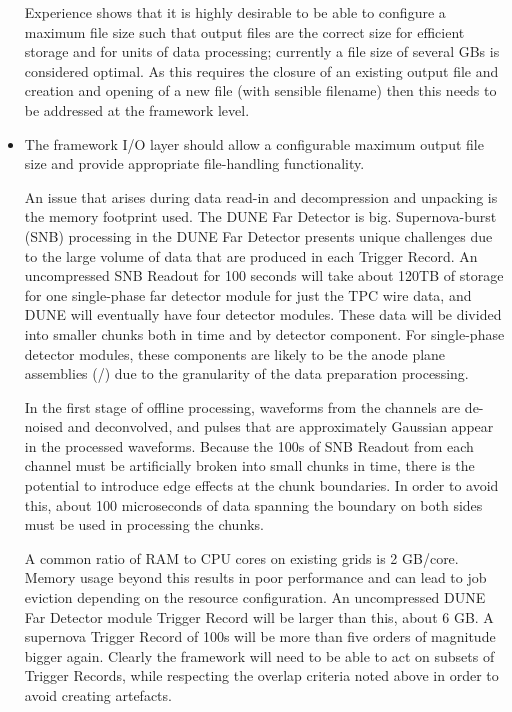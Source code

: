 \documentclass[../main-v1.tex]{subfiles}
\begin{document}
\begin{itemize}
Experience shows that it is highly desirable to be able to configure a maximum file size such that output files are the correct size for efficient storage and for units of data processing; currently a file size of several GBs is considered optimal.  As this requires the closure of an existing output file and creation and opening of a new file (with sensible filename) then this needs to be addressed at the framework level.

\item The framework I/O layer should allow a configurable maximum output file size and provide appropriate file-handling functionality.




An issue that arises during data read-in and decompression and unpacking is the memory footprint used.  The DUNE Far Detector is big.  Supernova-burst (SNB) processing in the DUNE Far Detector presents unique challenges due to the large volume of data that are produced in each Trigger Record.  An uncompressed SNB Readout for 100 seconds will take about 120TB of storage for one single-phase far detector module for just the TPC wire data, and DUNE will eventually have four detector modules.  These data will be divided into smaller chunks both in time and by detector component.  For single-phase detector modules, these components are likely to be the anode plane assemblies (/) due to the granularity of the data preparation processing.

In the first stage of offline processing, waveforms from the channels are de-noised and deconvolved, and pulses that are approximately Gaussian appear in the processed waveforms. Because the 100s of SNB Readout from each channel must be artificially broken into small chunks in time, there is the potential to introduce edge effects at the chunk boundaries. In order to avoid this, about 100 microseconds of data spanning the boundary on both sides must be used in processing the chunks.

A common ratio of RAM to CPU cores on existing grids is 2 GB/core.  Memory usage beyond this results in poor performance and can lead to job eviction depending on the resource configuration.  An uncompressed DUNE Far Detector module Trigger Record will be larger than this, about 6 GB.  A supernova Trigger Record of 100s will be more than five orders of magnitude bigger again.  Clearly the framework will need to be able to act on subsets of Trigger Records, while respecting the overlap criteria noted above in order to avoid creating artefacts.


\end{itemize}
\end{document}
